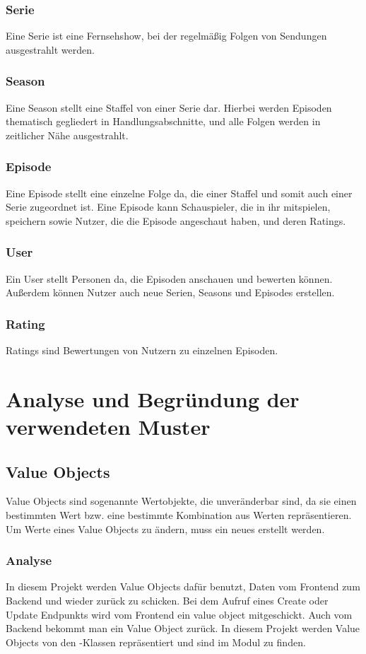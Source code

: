 \subsubsection{Serie}
Eine Serie ist eine Fernsehshow, bei der regelmäßig Folgen von Sendungen ausgestrahlt werden.
\subsubsection{Season}
Eine Season stellt eine Staffel von einer Serie dar. Hierbei werden Episoden thematisch gegliedert in Handlungsabschnitte, und alle Folgen werden in zeitlicher Nähe ausgestrahlt.
\subsubsection{Episode}
Eine Episode stellt eine einzelne Folge da, die einer Staffel und somit auch einer Serie zugeordnet ist. Eine Episode kann Schauspieler, die in ihr mitspielen, speichern sowie Nutzer, die die Episode angeschaut haben, und deren Ratings.
\subsubsection{User}
Ein User stellt Personen da, die Episoden anschauen und bewerten können. Außerdem können Nutzer auch neue Serien, Seasons und Episodes erstellen.
\subsubsection{Rating}
Ratings sind Bewertungen von Nutzern zu einzelnen Episoden.

\section{Analyse und Begründung der verwendeten Muster}

    \subsection{Value Objects}
    Value Objects sind sogenannte Wertobjekte, die unveränderbar sind, da sie einen bestimmten Wert bzw. eine bestimmte Kombination aus Werten repräsentieren. Um Werte eines Value Objects zu ändern, muss ein neues erstellt werden.

        \subsubsection{Analyse}
        In diesem Projekt werden Value Objects dafür benutzt, Daten vom Frontend zum Backend und wieder zurück zu schicken. Bei dem Aufruf eines Create oder Update Endpunkts wird vom Frontend ein value object mitgeschickt. Auch vom Backend bekommt man ein Value Object zurück. In diesem Projekt werden Value Objects von den -Klassen repräsentiert und sind im Modul  zu finden.

